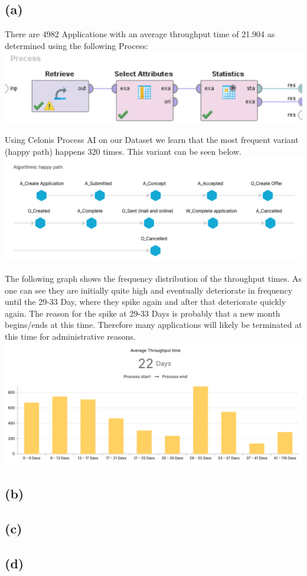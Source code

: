 \documentclass[../../main.tex]{subfiles}
\begin{document}
\subsection*{(a)}
There are 4982 Applications with an average throughput time of 21.904 as determined using the following Process:\\
\includegraphics[width=\textwidth]{img/QUESTION_5a_PROCESS_average_throughput_time.png}

Using Celonis Process AI on our Dataset we learn that the most frequent variant (happy path) happens 320 times. This variant can be seen below.\\
\includegraphics[width=\textwidth]{img/QUESTION_5a_happy_path.png}

The following graph shows the frequency distribution of the throughput times. As one can see they are initially quite high and eventually deteriorate in frequency until the 29-33 Day, where they spike again and after that deteriorate quickly again. The reason for the spike at 29-33 Days is probably that a new month begins/ends at this time. Therefore many applications will likely be terminated at this time for administrative reasons.\\
\includegraphics[width=\textwidth]{img/QUESTION_5a_throughput_time_distribution.png}





\subsection*{(b)}
\subsection*{(c)}
\subsection*{(d)}
\end{document}
